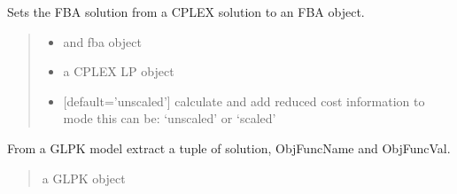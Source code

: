 \documentclass[letterpaper,12pt,english]{sphinxmanual}
\begin{document}

\begin{fulllineitems}
\label{\detokenize{api/solvers:cbmpy.CBGLPK.glpk_setFBAsolutionToModel}}
\pysigstartsignatures
\pysiglinewithargsret
{}
{\sphinxparamcomma {}\sphinxparamcomma {}}
{}
\pysigstopsignatures
\sphinxAtStartPar
Sets the FBA solution from a CPLEX solution to an FBA object.
\begin{quote}\begin{description}
\begin{itemize}
\item {} 
\sphinxAtStartPar
{} \textendash{} and fba object

\item {} 
\sphinxAtStartPar
{} \textendash{} a CPLEX LP object

\item {} 
\sphinxAtStartPar
{} \textendash{} {[}default=’unscaled’{]} calculate and add reduced cost information to mode this can be: ‘unscaled’ or ‘scaled’

\end{itemize}

\end{description}\end{quote}

\end{fulllineitems}


\begin{fulllineitems}
\label{\detokenize{api/solvers:cbmpy.CBGLPK.glpk_getOptimalSolution}}
\pysigstartsignatures
\pysiglinewithargsret
{}
{}
{}
\pysigstopsignatures
\sphinxAtStartPar
From a GLPK model extract a tuple of solution, ObjFuncName and ObjFuncVal.
\begin{quote}\begin{description}
\sphinxAtStartPar
{} \textendash{} a GLPK object

\end{description}\end{quote}

\end{fulllineitems}
\end{document}
